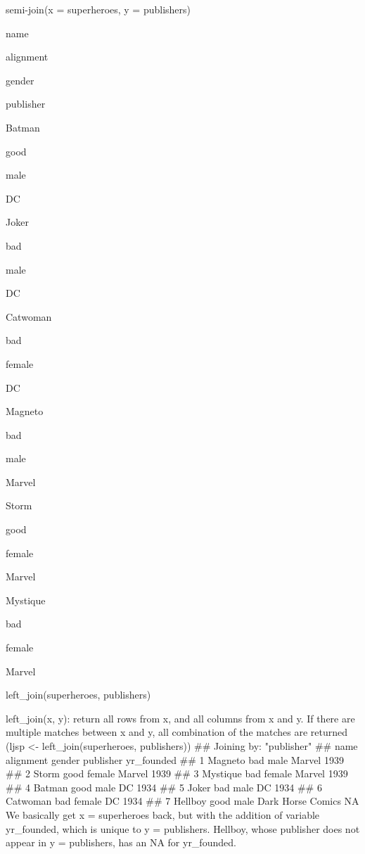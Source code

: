 semi-join(x = superheroes, y = publishers)
 


name
 
alignment
 
gender
 
publisher
 



Batman
 
good
 
male
 
DC
 


Joker
 
bad
 
male
 
DC
 


Catwoman
 
bad
 
female
 
DC
 


Magneto
 
bad
 
male
 
Marvel
 


Storm
 
good
 
female
 
Marvel
 


Mystique
 
bad
 
female
 
Marvel
 



left_join(superheroes, publishers)
 

left_join(x, y): return all rows from x, and all columns from x and y. If there are multiple matches between x and y, all combination of the matches are returned
 (ljsp <- left_join(superheroes, publishers)) ## Joining by: "publisher" ##       name alignment gender         publisher yr_founded
## 1  Magneto       bad   male            Marvel       1939
## 2    Storm      good female            Marvel       1939
## 3 Mystique       bad female            Marvel       1939
## 4   Batman      good   male                DC       1934
## 5    Joker       bad   male                DC       1934
## 6 Catwoman       bad female                DC       1934
## 7  Hellboy      good   male Dark Horse Comics         NA 
We basically get x = superheroes back, but with the addition of variable yr_founded, which is unique to y = publishers. Hellboy, whose publisher does not appear in y = publishers, has an NA for yr_founded.
 



